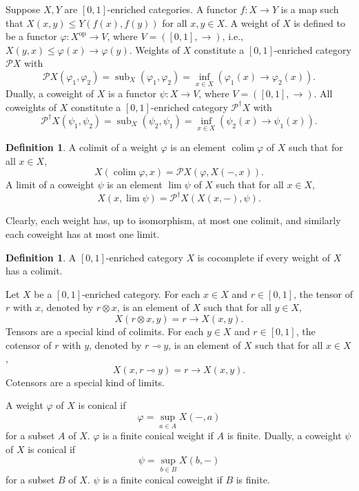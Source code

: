 \documentclass[preprint,3p,times]{elsarticle}
\theoremstyle{plain}
\theoremstyle{definition}
\newtheorem{definition}[thm]{Definition}
\renewcommand{\phi}{\varphi}
\numberwithin{equation}{section}
\begin{document}
Suppose $X,Y$ are \([0,1]\)-enriched categories. A functor $f:X \to Y$ is a map such that $X(x,y) \leq Y(f(x),f(y))$ for all $x,y \in X$. A weight of \( X \) is defined to be a functor \( \phi: X^{\mathrm{op}} \to V \), where \( V = ([0,1], \rightarrow) \), i.e., \(X(y,x)\le \phi(x)\rightarrow \phi(y)\). Weights of $X$ constitute a \([0,1]\)-enriched category \( \mathcal{P}X\) with \[ \mathcal{P}X(\phi_1,\phi_2)=\operatorname{sub}_X(\phi_1,\phi_2)=\inf_{x\in X}\left(\phi_1(x)\rightarrow \phi_2(x)\right).\]
Dually, a coweight of $X$ is a functor $\psi: X \to V$, where $V= ([0,1], \rightarrow)$. All coweights of
$X$ constitute a \([0,1]\)-enriched category $\mathcal{P}^\dagger X$ with
\[
\mathcal{P}^\dagger X(\psi_1, \psi_2)= \operatorname{sub}_X(\psi_2, \psi_1)=\inf_{x\in X}\left(\psi_2(x)\rightarrow \psi_1(x)\right).
\]
\begin{definition}
    A colimit of a weight $\phi$ is an element $\operatorname{colim}\phi$ of $X$ such that for all $x \in X$,
\[
X(\operatorname{colim}\phi, x) = \mathcal{P}X(\phi, X(-,x)).
\]
A limit of a coweight $\psi$ is an element $\operatorname{lim}\psi$ of $X$ such that for all $x \in X$,
\[
X(x, \operatorname{lim}\psi ) = \mathcal{P}^\dagger X( X(x,-), \psi).
\]
\end{definition}
Clearly, each weight has, up to isomorphism, at most one colimit, and similarly each coweight has at most one limit.

\begin{definition}
	A \([0,1]\)-enriched category $X$ is cocomplete if every weight of $X$ has
	a colimit.
\end{definition}

Let $X$ be a \([0,1]\)-enriched category.  For each $x\in X$ and $r\in [0,1]$, the tensor of $r$ with $x$, denoted by $r\otimes x$, is an element of $X$ such that for all $y\in X$,$$X(r\otimes x,y)=r\rightarrow X(x,y).$$
Tensors are a special kind of colimits. 
For each $y\in X$ and $r\in [0,1]$, the cotensor of $r$ with $y$, denoted by $r\multimap  y$, is an element of $X$ such that for all $x\in X$,$$X( x,r\multimap y)=r\rightarrow X(x,y).$$
Cotensors are a special kind of limits.


A weight $\phi$ of $X$ is conical if \[
\phi = \sup_{a \in A} X(-,a)
\]
for a subset $A$ of $X$. \(\phi\) is a finite conical weight if  \(A\) is finite.  Dually, a coweight $\psi$ of
$X$ is conical if
\[
\psi = \sup_{b \in B} X(b,-)
\]
for a  subset $B$ of $X$.   \(\psi\) is a finite conical coweight if  \(B\) is finite.
\end{document}
